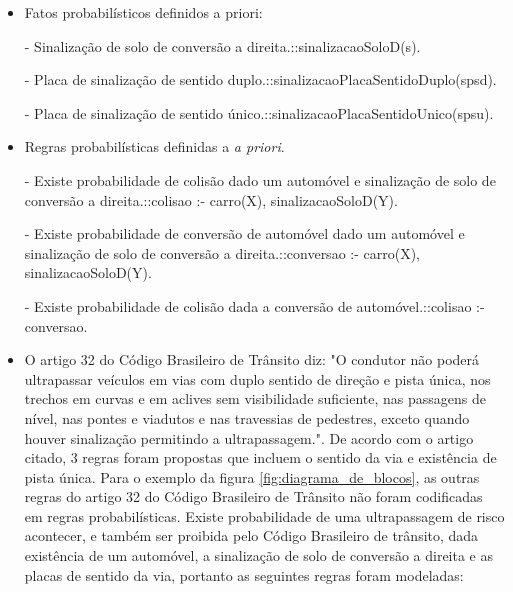 \documentclass[
	12pt,				%
    oneside,			%
	a4paper,			%
	english,			%
	french,				%
	spanish,			%
	brazil,				%
	]{abntex2}
\begin{document}
\begin{enumerate}
\begin{itemize}
            \item Fatos probabilísticos definidos a priori:\newline
            
            - Sinalização de solo de conversão a direita.::sinalizacaoSoloD(s).\newline

            - Placa de sinalização de sentido duplo.::sinalizacaoPlacaSentidoDuplo(spsd).\newline
            
            - Placa de sinalização de sentido único.::sinalizacaoPlacaSentidoUnico(spsu).\newline

            \item Regras probabilísticas definidas a \textit{a priori}.\newline


            - Existe probabilidade de colisão dado um automóvel e sinalização de solo de conversão a direita.::colisao :- carro(X), sinalizacaoSoloD(Y).\newline
            
            - Existe probabilidade de conversão de automóvel dado um automóvel e sinalização de solo de conversão a direita.::conversao :- carro(X), sinalizacaoSoloD(Y).\newline
            
            - Existe probabilidade de colisão dada a conversão de automóvel.::colisao :- conversao.\newline

           \item O artigo 32 do Código Brasileiro de Trânsito diz: "O condutor não poderá ultrapassar veículos em vias com duplo sentido de direção e pista única, nos trechos em curvas e em aclives sem visibilidade suficiente, nas passagens de nível, nas pontes e viadutos e nas travessias de pedestres, exceto quando houver sinalização permitindo a ultrapassagem.". De acordo com o artigo citado, 3 regras foram propostas que incluem o sentido da via e existência de pista única. Para o exemplo da figura \ref{fig:diagrama_de_blocos}, as outras regras do artigo 32 do Código Brasileiro de Trânsito não foram codificadas em regras probabilísticas. Existe probabilidade de uma ultrapassagem de risco acontecer, e também ser proibida pelo Código Brasileiro de trânsito, dada existência de um automóvel, a sinalização de solo de conversão a direita e as placas de sentido da via, portanto as seguintes regras foram modeladas:\newline
           

\end{itemize}
\end{enumerate}
\end{document}
